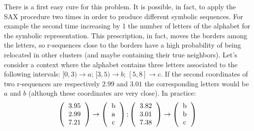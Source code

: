 \documentclass[a4paper,twoside]{article}
\begin{document}
There is a first easy cure for this problem. It is possible, in fact, to apply the SAX procedure two times in order to produce different symbolic sequences. For example the second time increasing  by 1 the number of letters of the alphabet for the symbolic representation. This prescription, in fact, moves the borders among the letters, so r-sequences close to the borders have a high probability of being relocated in other clusters (and maybe containing their true neighbors). 
%
Let's consider a context where the alphabet contains three letters associated to the following intervals: $[0, 3)  \longrightarrow  a$; $[3, 5)  \longrightarrow  b$; $[5,8]   \longrightarrow  c$.
%
%
If the second coordinates of two r-sequences are respectively $2.99$ and $3.01$ the corresponding letters would be $a$ and $b$ (although these coordinates are very close). In practice:
\begin{equation}
 \left(
   \begin{tabular}{c}
       3.95 \\
       2.99 \\
       7.21
   \end{tabular}
 \right)
 \rightarrow
  \left(
   \begin{tabular}{c}
       b \\
       a \\
       c
   \end{tabular}
 \right)
 ;
 \left(
   \begin{tabular}{c}
       3.82 \\
       3.01 \\
       7.38
   \end{tabular}
 \right)
 \rightarrow
  \left(
   \begin{tabular}{c}
       b \\
       b \\
       c 
   \end{tabular}
 \right)
\end{equation}
\end{document}
